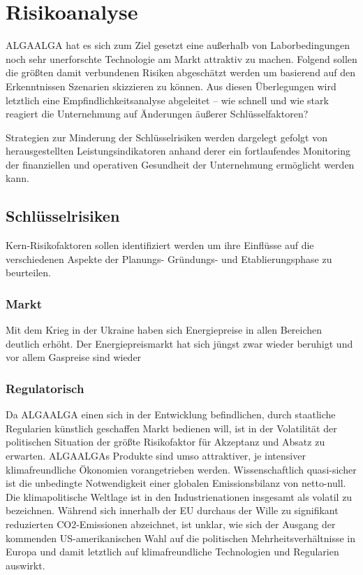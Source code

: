 \chapter{Risikoanalyse}

    ALGAALGA hat es sich zum Ziel gesetzt eine außerhalb von Laborbedingungen noch sehr unerforschte Technologie am Markt attraktiv zu machen.
    Folgend sollen die größten damit verbundenen Risiken abgeschätzt werden um basierend auf den Erkenntnissen Szenarien skizzieren zu können.
    Aus diesen Überlegungen wird letztlich eine Empfindlichkeitsanalyse abgeleitet -- wie schnell und wie stark reagiert die Unternehmung auf Änderungen äußerer Schlüsselfaktoren?\par\medskip

    Strategien zur Minderung der Schlüsselrisiken werden dargelegt gefolgt von herausgestellten Leistungsindikatoren anhand derer ein fortlaufendes Monitoring der finanziellen und operativen Gesundheit der Unternehmung ermöglicht werden kann.

    \section{Schlüsselrisiken}

        Kern-Risikofaktoren sollen identifiziert werden um ihre Einflüsse auf die verschiedenen Aspekte der Planungs- Gründungs- und Etablierungsphase zu beurteilen.

        \subsection{Markt}

            Mit dem Krieg in der Ukraine haben sich Energiepreise in allen Bereichen deutlich erhöht.
            Der Energiepreismarkt hat sich jüngst zwar wieder beruhigt und vor allem Gaspreise sind wieder 

        \subsection{Regulatorisch}
            Da ALGAALGA einen sich in der Entwicklung befindlichen, durch staatliche Regularien künstlich geschaffen Markt bedienen will, ist in der Volatilität der politischen Situation der größte Risikofaktor für Akzeptanz und Absatz zu erwarten.
            ALGAALGAs Produkte sind umso attraktiver, je intensiver klimafreundliche Ökonomien vorangetrieben werden. 
            Wissenschaftlich quasi-sicher ist die unbedingte Notwendigkeit einer globalen Emissionsbilanz von netto-null.
            Die klimapolitische Weltlage ist in den Industrienationen insgesamt als volatil zu bezeichnen.
            Während sich innerhalb der EU durchaus der Wille zu signifikant reduzierten CO2-Emissionen abzeichnet, ist unklar, wie sich der Ausgang der kommenden US-amerikanischen Wahl auf die politischen Mehrheitsverhältnisse in Europa und damit letztlich auf klimafreundliche Technologien und Regularien auswirkt.
            
